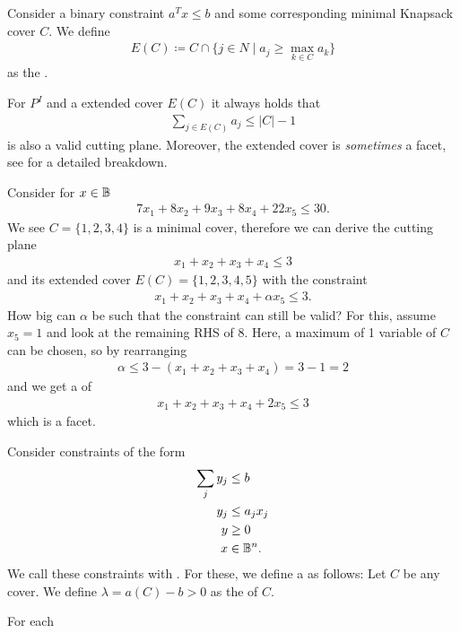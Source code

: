 
\begin{definition}
    Consider a binary constraint $a^Tx \leq b$ and some corresponding minimal Knapsack cover $C$.
    We define
    \begin{align*}
        E(C) \coloneqq C \cap \{j \in N \mid a_j \geq \max_{k \in C} a_k\}
    \end{align*}
    as the .
\end{definition}
\begin{observe}
    For $P^I$ and a extended cover $E(C)$ it always holds that
    \begin{align*}
        \sum_{j \in E(C)}a_j \leq |C|-1
    \end{align*}
    is also a valid cutting plane.
    Moreover, the extended cover is \emph{sometimes} a facet, see \cite[Ch.~II.2, Prop. 23]{int-comb-optimization} for a detailed breakdown.
\end{observe}
\begin{example}
    Consider for $x \in \mathbb{B}$
    \begin{align*}
        7x_1+8x_2+9x_3+8x_4+22x_5 \leq 30.
    \end{align*}
    We see $C=\{1,2,3,4\}$ is a minimal cover, therefore we can derive the cutting plane
    \begin{align*}
        x_1+x_2+x_3+x_4 \leq 3
    \end{align*}
    and its extended cover $E(C) = \{1,2,3,4,5\}$ with the constraint
    \begin{align*}
        x_1+x_2+x_3+x_4+ \alpha x_5 \leq 3.
    \end{align*}
    How big can $\alpha$ be such that the constraint can still be valid?
    For this, assume $x_5=1$ and look at the remaining RHS of $8$. Here, a maximum of 1 variable of $C$ can be chosen, so by rearranging
    \begin{align*}
        \alpha \leq 3 - (x_1+x_2+x_3+x_4) = 3-1=2
    \end{align*}
    and we get a  of
    \begin{align*}
        x_1+x_2+x_3+x_4+ 2 x_5 \leq 3
    \end{align*}
    which is a facet.
\end{example}

\begin{definition}
    Consider constraints of the form
    \begin{align*}
        \sum_j y_j & \leq b       \\
        y_j        & \leq a_jx_j  \\
        y          & \geq 0       \\
        x          & \in \mathbb{B}^n.
    \end{align*}
    We call these constraints with .
    For these, we define a  as follows:
    Let $C$ be any cover. We define $\lambda = a(C)-b > 0$ as the  of $C$.
\end{definition}
For each 
